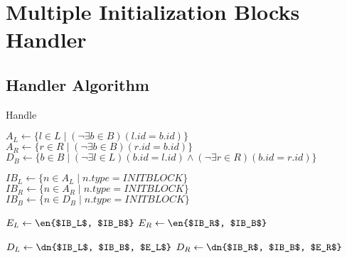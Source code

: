 \documentclass[../../Algorithms.tex]{subfiles}
\begin{document}
    \section{Multiple Initialization Blocks Handler}

    \subsection{Handler Algorithm}

    \begin{algorithm}[H]
        \caption{Handle}


        \BlankLine
        $A_L \leftarrow \{l \in L \mid (\lnot \exists b \in B)(l.id = b.id)\}$\;
        $A_R \leftarrow \{r \in R \mid (\lnot \exists b \in B)(r.id = b.id)\}$\;
        $D_B \leftarrow \{b \in B \mid (\lnot \exists l \in L)(b.id = l.id) \land (\lnot \exists r \in R)(b.id = r.id)\}$\;

        \BlankLine
        $IB_L \leftarrow \{n \in A_L \mid n.type = INITBLOCK\}$\;
        $IB_R \leftarrow \{n \in A_R \mid n.type = INITBLOCK\}$\;
        $IB_B \leftarrow \{n \in D_B \mid n.type = INITBLOCK\}$\;

        \BlankLine
        $E_L \leftarrow \en{$IB_L$, $IB_B$}$\;
        $E_R \leftarrow \en{$IB_R$, $IB_B$}$\;

        \BlankLine
        $D_L \leftarrow \dn{$IB_L$, $IB_B$, $E_L$}$\;
        $D_R \leftarrow \dn{$IB_R$, $IB_B$, $E_R$}$\;
        
        \BlankLine
\end{algorithm}
\end{document}
